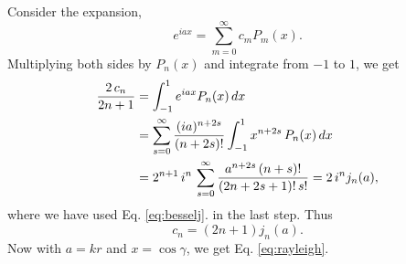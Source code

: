 \documentclass[11pt]{article}
\begin{document}
Consider the expansion,
\[
  e^{iax} = \sum_{m = 0}^\infty c_m P_m(x).
\]
Multiplying both sides by $P_n(x)$ and integrate from $-1$ to $1$,
we get
\begin{align*}
  \frac{ 2 \, c_n } { 2 n + 1}
&=
  \int_{-1}^1
  e^{iax} P_n(x) \, dx
  \notag \\
&=
  \sum_{s = 0}^\infty
  \frac{ (ia)^{n + 2s} } { (n + 2s)! }
  \int_{-1}^1
  x^{n + 2 s} \, P_n(x) \, dx
  \notag \\
&=
  2^{n+1} \, i^n \,
  \sum_{s = 0}^\infty
  \frac{ a^{n + 2s} \, (n + s)! }
  { (2n + 2s + 1)! \, s! }
= 2 \, i^n j_n(a),
\end{align*}
where we have used Eq. \eqref{eq:besselj}.
in the last step.
%
Thus
\[
  c_n = (2 n + 1) j_n(a).
\]
Now with $a = kr$ and $x = \cos\gamma$, we get Eq. \eqref{eq:rayleigh}.





\end{document}
